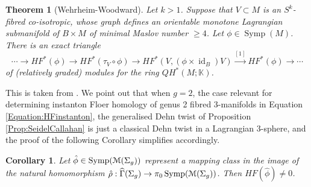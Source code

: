 \documentclass[reqno,10pt]{amsart}
\numberwithin{equation}{section}
\newcommand{\bK}{{\mathbb K}}
\newcommand{\scrM}{\EuScript{M}}
\newcommand{\id}{\operatorname{id}}
\newcommand{\Symp}{\operatorname{Symp}}
\newtheorem{Theorem}[thm]{Theorem}
\newtheorem{Corollary}[thm]{Corollary}
\theoremstyle{remark}
\begin{document}
\begin{Theorem}[Wehrheim-Woodward] \label{Thm:WWtriangle}
Let $k>1$.  Suppose that $V\subset M$ is an $S^k$-fibred co-isotropic, whose graph defines an orientable monotone  Lagrangian submanifold of $B \times M$ of minimal Maslov number $\geq 4$. Let $\phi \in \Symp(M)$. There is an exact triangle
\[
\cdots \rightarrow HF^*(\phi) \rightarrow HF^*(\tau_V \circ \phi) \rightarrow HF^*(V, (\phi\times\id_B)V) \stackrel{[1]}{\longrightarrow} HF^*(\phi) \rightarrow \cdots
\]
of (relatively graded) modules for the ring $QH^*(M;\bK)$.
\end{Theorem}

This is taken from \cite{WW:triangle}.  We point out that when $g=2$, the case  relevant for determining instanton Floer homology of genus 2 fibred 3-manifolds in Equation \ref{Equation:HFinstanton}, the generalised Dehn twist of Proposition \ref{Prop:SeidelCallahan} is just a classical Dehn twist in a Lagrangian 3-sphere, and the proof of the following Corollary simplifies accordingly.

\begin{Corollary} \label{Cor:FixPoint}
Let $\hat\phi \in \Symp(\scrM(\Sigma_g))$ represent a mapping class in the image of the natural homomorphism $\hat\rho: \widehat{\Gamma}(\Sigma_g) \rightarrow \pi_0\Symp(\scrM(\Sigma_g))$. Then $HF(\hat\phi) \neq 0$.
\end{Corollary}
\end{document}
